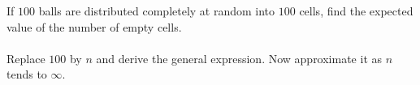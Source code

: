 \begin{problem}[Handout 1, \# 20]
  If \(100\) balls are distributed completely at random into \(100\) cells,
  find the expected value of the number of empty cells.
  \\\\
  Replace \(100\) by \(n\) and derive the general expression. Now
  approximate it as \(n\) tends to \(\infty\).
\end{problem}
\begin{solution}
\end{solution}

